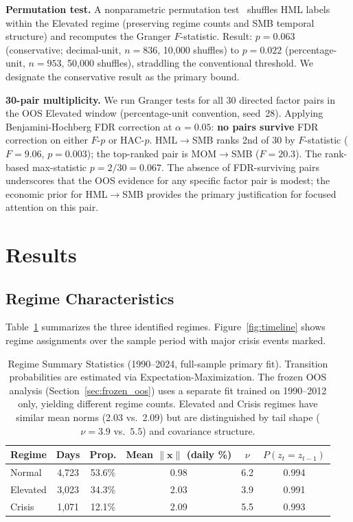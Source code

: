 \documentclass[sigconf,anonymous]{acmart}
\begin{document}
\textbf{Permutation test.} A nonparametric permutation
test~\cite{good2005permutation} shuffles HML labels within the Elevated regime
(preserving regime counts and SMB temporal structure) and recomputes the Granger
$F$-statistic. Result: $p = 0.063$ (conservative; decimal-unit, $n = 836$,
10{,}000 shuffles) to $p = 0.022$ (percentage-unit, $n = 953$, 50{,}000 shuffles),
straddling the conventional threshold. We designate the conservative result as the
primary bound.

\textbf{30-pair multiplicity.} We run Granger tests for all 30 directed factor pairs
in the OOS Elevated window (percentage-unit convention, seed~28).
Applying Benjamini-Hochberg FDR correction at $\alpha = 0.05$:
\textbf{no pairs survive} FDR correction on either $F$-$p$ or HAC-$p$.
HML$\to$SMB ranks 2nd of 30 by $F$-statistic
($F = 9.06$, $p = 0.003$); the top-ranked pair is MOM$\to$SMB ($F = 20.3$).
The rank-based max-statistic $p = 2/30 = 0.067$.
The absence of FDR-surviving pairs underscores that the OOS evidence for any
specific factor pair is modest; the economic prior for HML$\to$SMB provides the
primary justification for focused attention on this pair.

\section{Results}

\subsection{Regime Characteristics}

Table~\ref{tab:regimes} summarizes the three identified regimes. Figure~\ref{fig:timeline}
shows regime assignments over the sample period with major crisis events marked.

\begin{table}[t]
\centering
\caption[Regime statistics]{Regime Summary Statistics (1990--2024, full-sample primary fit). Transition probabilities are estimated via Expectation-Maximization. The frozen OOS analysis (Section~\ref{sec:frozen_oos}) uses a separate fit trained on 1990--2012 only, yielding different regime counts. Elevated and Crisis regimes have similar mean norms (2.03 vs.\ 2.09) but are distinguished by tail shape ($\nu = 3.9$ vs.\ $5.5$) and covariance structure.}
\label{tab:regimes}
\small
\setlength{\tabcolsep}{4pt}
\begin{tabular}{lccccc}
\toprule
Regime & Days & Prop. & Mean $\|\mathbf{x}\|$ (daily \%) & $\nu$ & $P(z_t=z_{t-1})$ \\
\midrule
Normal & 4,723 & 53.6\% & 0.98 & 6.2 & 0.994 \\
Elevated & 3,023 & 34.3\% & 2.03 & 3.9 & 0.991 \\
Crisis & 1,071 & 12.1\% & 2.09 & 5.5 & 0.993 \\
\bottomrule
\end{tabular}
\setlength{\tabcolsep}{6pt}
\end{table}
\end{document}
